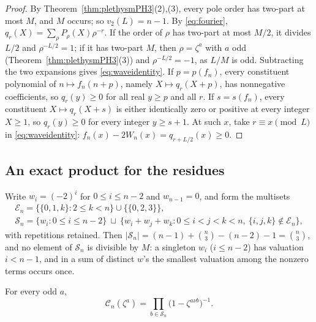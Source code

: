 \begin{proof}
By Theorem~\ref{thm:plethysmPH3}(2),(3), every pole order has two-part at most
$M$, and $M$ occurs; so $v_2(L)=n-1$. By \eqref{eq:fourier},
$q_r(X)=\sum_\rho P_\rho(X)\rho^{-r}$. If the order of $\rho$ has two-part at
most $M/2$, it divides $L/2$ and $\rho^{-L/2}=1$; if it has two-part $M$, then
$\rho=\zeta^a$ with $a$ odd (Theorem~\ref{thm:plethysmPH3}(3)) and
$\rho^{-L/2}=-1$, as $L/M$ is odd. Subtracting the two expansions gives
\eqref{eq:waveidentity}. If $p=p(f_n)$, every constituent polynomial of
$n\mapsto f_n(n+p)$, namely $X\mapsto q_r(X+p)$, has nonnegative coefficients,
so $q_r(y)\ge0$ for all real $y\ge p$ and all $r$. If $s=s(f_n)$, every
constituent $X\mapsto q_r(X+s)$ is either identically zero or positive at every
integer $X\ge1$, so $q_r(y)\ge0$ for every integer $y\ge s+1$. At such $x$, take
$r\equiv x\pmod L$ in \eqref{eq:waveidentity}: $f_n(x)-2W_n(x)=
q_{r+L/2}(x)\ge0$.
\end{proof}

\subsection{An exact product for the residues}

Write $w_i=(-2)^i$ for $0\le i\le n-2$ and $w_{n-1}=0$, and form the multisets
\begin{equation}\label{eq:Sn}
\begin{gathered}
 \mathcal E_n=\{\{0,1,k\}:2\le k<n\}\cup\{\{0,2,3\}\},\\
 \mathcal S_n=\{w_i:0\le i\le n-2\}\ \sqcup\ \{w_i+w_j+w_k:0\le i<j<k<n,\
 \{i,j,k\}\notin\mathcal E_n\},
\end{gathered}
\end{equation}
with repetitions retained. Then $|\mathcal S_n|=(n-1)+\binom n3-(n-2)-1=
\binom n3$, and no element of $\mathcal S_n$ is divisible by $M$: a singleton
$w_i$ ($i\le n-2$) has valuation $i<n-1$, and in a sum of distinct $w$'s the
smallest valuation among the nonzero terms occurs once.

\begin{proposition}\label{prop:product}
For every odd $a$,
\begin{equation}\label{eq:product}
 \mathcal C_n(\zeta^a)=\prod_{b\in\mathcal S_n}\bigl(1-\zeta^{a\nu b}\bigr)^{-1}.
\end{equation}
\end{proposition}

